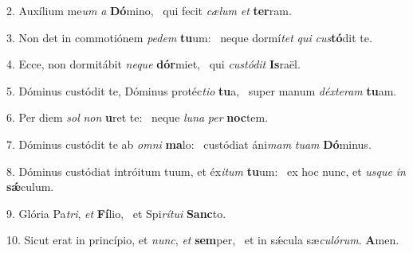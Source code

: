 2. Auxílium me\textit{um} \textit{a} \textbf{Dó}mino, \ast\  qui fecit \textit{cæ}\textit{lum} \textit{et} \textbf{ter}ram.\

3. Non det in commotiónem \textit{pe}\textit{dem} \textbf{tu}um: \ast\  neque dormí\textit{tet} \textit{qui} \textit{cus}\textbf{tó}dit te.\

4. Ecce, non dormitábit \textit{ne}\textit{que} \textbf{dór}miet, \ast\  qui \textit{cus}\textit{tó}\textit{dit} \textbf{Is}raël.\

5. Dóminus custódit te, Dóminus protéc\textit{ti}\textit{o} \textbf{tu}a, \ast\  super manum \textit{déx}\textit{te}\textit{ram} \textbf{tu}am.\

6. Per diem \textit{sol} \textit{non} \textbf{u}ret te: \ast\  neque \textit{lu}\textit{na} \textit{per} \textbf{noc}tem.\

7. Dóminus custódit te ab \textit{om}\textit{ni} \textbf{ma}lo: \ast\  custódiat áni\textit{mam} \textit{tu}\textit{am} \textbf{Dó}minus.\

8. Dóminus custódiat intróitum tuum, et éx\textit{i}\textit{tum} \textbf{tu}um: \ast\  ex hoc nunc, et \textit{us}\textit{que} \textit{in} \textbf{sǽ}culum.\

9. Glória Pa\textit{tri}, \textit{et} \textbf{Fí}lio, \ast\  et Spi\textit{rí}\textit{tu}\textit{i} \textbf{Sanc}to.\

10. Sicut erat in princípio, et \textit{nunc}, \textit{et} \textbf{sem}per, \ast\  et in sǽcula sæ\textit{cu}\textit{ló}\textit{rum}. \textbf{A}men.\

